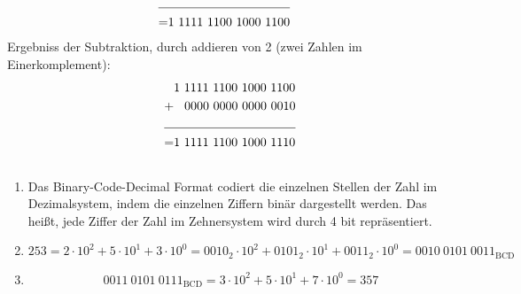 \documentclass[DIN, pagenumber=false, fontsize=11pt, parskip=half]{scrartcl}
\begin{document}
\begin{enumerate}[label = (\alph*)]
\begin{align*}
                \cline{1-2}  
                = & 1\ 1111\ 1100\ 1000\ 1100
            \end{align*}
            Ergebniss der Subtraktion, durch addieren von 2 (zwei Zahlen im Einerkomplement):
            \begin{align*}
                & 1\ 1111\ 1100\ 1000\ 1100 \\
                + & \hspace{0.3cm}0000\ 0000\ 0000\ 0010\\
                \cline{1-2}  
                = & 1\ 1111\ 1100\ 1000\ 1110
            \end{align*}
    \end{enumerate}

    \subsection{}
    \begin{enumerate}[label = (\alph*)]
        \item Das Binary-Code-Decimal Format codiert die einzelnen Stellen der Zahl im Dezimalsystem, indem die einzelnen Ziffern binär dargestellt werden.
            Das heißt, jede Ziffer der Zahl im Zehnersystem wird durch 4 bit repräsentiert.
        \item 
            \begin{equation*}
                253 = 2 \cdot 10^2 + 5 \cdot 10^1 + 3 \cdot 10^0 = {0010}_2 \cdot 10^2 + {0101}_2 \cdot 10^1 + {0011}_2 \cdot 10^0 = {0010\ 0101\ 0011}_\text{BCD}
            \end{equation*}
        \item 
            \begin{equation*}
                {0011\ 0101\ 0111}_\text{BCD} = 3 \cdot 10^2 + 5 \cdot 10^1 + 7 \cdot 10^0 = 357
            \end{equation*}
    \end{enumerate}
\end{document}
